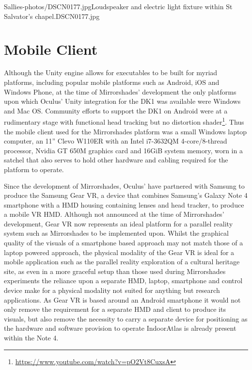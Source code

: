        {Sallies-photos/DSCN0177.jpg}{Loudspeaker and electric light fixture within St Salvator's chapel.}{DSCN0177.jpg}
       

\section{Mobile Client}
\label{mobile-client}
Although the Unity engine allows for executables to be built for myriad platforms, including popular mobile platforms such as Android, iOS and Windows Phone, at the time of Mirrorshades' development the only platforms upon which Oculus' Unity integration for the DK1 was available were Windows and Mac OS. Community efforts to support the DK1 on Android were at a rudimentary stage with functional head tracking but no distortion shader\footnote{\url{https://www.youtube.com/watch?v=pO2Vt8CuxsA}}. Thus the mobile client used for the Mirrorshades platform was a small Windows laptop computer, an 11'' Clevo W110ER with an Intel i7-3632QM 4-core/8-thread processor, Nvidia GT 650M graphics card and 16GiB system memory, worn in a satchel that also serves to hold other hardware and cabling required for the platform to operate.

Since the development of Mirrorshades, Oculus' have partnered with Samsung to produce the Samsung Gear VR, a device that combines Samsung's Galaxy Note 4 smartphone with a HMD housing containing lenses and head tracker, to produce a mobile VR HMD. Although not announced at the time of Mirrorshades' development, Gear VR now represents an ideal platform for a parallel reality system such as Mirrorshades to be implemented upon. Whilst the graphical quality of the visuals of a smartphone based approach may not match those of a laptop powered approach, the physical modality of the Gear VR is ideal for a mobile application such as the parallel reality exploration of a cultural heritage site, as even in a more graceful setup than those used during Mirrorshades experiments the reliance upon a separate HMD, laptop, smartphone and control device make for a physical modality not suited for anything but research applications. As Gear VR is based around an Android smartphone it would not only remove the requirement for a separate HMD and client to produce its visuals, but also remove the necessity to carry a separate device for positioning as the hardware and software provision to operate IndoorAtlas is already present within the Note 4.

